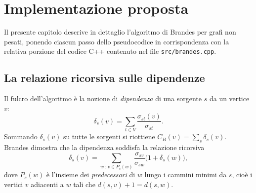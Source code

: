 \documentclass[11pt,a4paper]{report}
\begin{document}
\chapter{Implementazione proposta}

Il presente capitolo descrive in dettaglio l'algoritmo di Brandes per grafi non
pesati, ponendo ciascun passo dello pseudocodice in corrispondenza con la
relativa porzione del codice C++ contenuto nel file \texttt{src/brandes.cpp}.

\section{La relazione ricorsiva sulle dipendenze}

Il fulcro dell'algoritmo è la nozione di \emph{dipendenza} di una sorgente $s$ da
un vertice $v$:
\begin{equation}
	\delta_s(v) = \sum_{t\in V} \frac{\sigma_{st}(v)}{\sigma_{st}}.
\end{equation}
Sommando $\delta_s(v)$ su tutte le sorgenti si riottiene
$C_B(v)=\sum_{s}\delta_s(v)$. Brandes dimostra che la dipendenza soddisfa la
relazione ricorsiva
\begin{equation}
	\delta_s(v) = \sum_{w\,:\,v\in P_s(w)}
	\frac{\sigma_{sv}}{\sigma_{sw}}\bigl(1+\delta_s(w)\bigr),
	\label{eq:ricorsione}
\end{equation}
dove $P_s(w)$ è l'insieme dei \emph{predecessori} di $w$ lungo i cammini minimi
da $s$, cioè i vertici $v$ adiacenti a $w$ tali che
$d(s,v)+1 = d(s,w)$.
\end{document}
